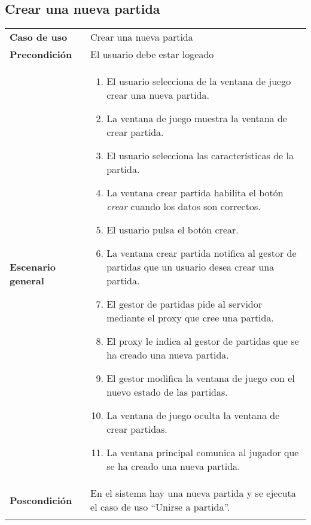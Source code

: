 \subsection{Crear una nueva partida}
{\footnotesize
\begin{tabularx}{0.95\textwidth}{p{}|X}

\textbf{Caso de uso} & Crear una nueva partida \\

\textbf{Precondición} & El usuario debe estar logeado \\

\textbf{Escenario general} & \begin{enumerate}
\item El usuario selecciona de la ventana de juego crear una nueva partida.
\item La ventana de juego muestra la ventana de crear partida.
\item El usuario selecciona las características de la partida.
\item La ventana crear partida habilita el botón \emph{crear} cuando los datos
son correctos.
\item El usuario pulsa el botón crear.
\item La ventana crear partida notifica al gestor de partidas que un usuario
desea crear una partida.
\item El gestor de partidas pide al servidor mediante el proxy que cree una
partida.
\item El proxy le indica al gestor de partidas que se ha creado una nueva
partida.
\item El gestor modifica la ventana de juego con el nuevo estado de las
partidas.
\item La ventana de juego oculta la ventana de crear partidas.
\item La ventana principal comunica al jugador que se ha creado una nueva
partida.
\end{enumerate} \\

\textbf{Poscondición} & En el sistema hay una nueva partida y se ejecuta el caso
 de uso ``Unirse a partida''.\\ \\


\end{tabularx}}
